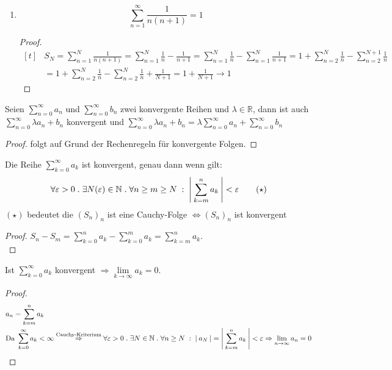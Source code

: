 \documentclass[a4paper,titlepage,oneside]{article}
\def\N{\ensuremath{\mathbb{N}} }
\def\R{\ensuremath{\mathbb{R}} }
\renewcommand{\epsilon}{\ensuremath{\varepsilon} }
\def\sp{\hspace{0,1cm}}
\def\spdot{\sp.\sp}
\def\spcolon{\sp:\sp}
\newcommand{\suminf}[2][n]{\ensuremath{\sum_{#1= 0}^{\infty}{#2}}}
\newcommand{\Suminf}[2][n]{\ensuremath{\sum_{#1=1}^{\infty}{#2}}}
\renewcommand{\liminf}[2][n]{\ensuremath{\lim\limits_{#1 \rightarrow \infty}{#2}}}
\newcommand{\abs}[1]{\ensuremath{\left|\:#1\:\right|}}
\theoremstyle{thmstyle}
\begin{document}
\begin{subbsp}
\begin{enumerate}
\begin{proof}
Würde \((S_N)_{N\ge1}\) konvergieren, dann auch die Teilfolge \((S_{2^N})_{N \ge 1}\), da diese dievergiert, divergiert auch \((S_N)_N\)\\
\end{proof}

\item
\[ \Suminf{\frac{1}{n(n+1)}}= 1 \]

\begin{proof}
\[\begin{aligned}[t]
&S_N = \sum_{n=1}^{N}{\frac{1}{n(n+1)}} = \sum_{n=1}^{N}{\frac{1}{n}} - \frac{1}{n+1} = \sum_{n=1}^{N}{\frac{1}{n}} - \sum_{n=1}^{N}{\frac{1}{n+1}}
= 1 + \sum_{n=2}^{N}{\frac{1}{n}} - \sum_{n=2}^{N+1}{\frac{1}{n}} \\
&= 1 + \sum_{n=2}^{N}{\frac{1}{n}} - \sum_{n=2}^{N}{\frac{1}{n}} + \frac{1}{N+1}
= 1 + \frac{1}{N+1} \longrightarrow 1
\end{aligned}\]
\end{proof}

\end{enumerate}
\end{subbsp}

\begin{subsatz}
Seien \suminf{a_n} und \suminf{b_n} zwei konvergente Reihen und \(\lambda \in \R\),
dann ist auch \(\suminf{\lambda a_n + b_n}\) konvergent und \(\suminf{\lambda a_n + b_n} = \lambda \suminf{a_n} + \suminf{b_n}\)
\begin{proof}
folgt auf Grund der Rechenregeln für konvergente Folgen.
\end{proof}
\end{subsatz}

\begin{subsatz}
Die Reihe \(\suminf[k]{a_k}\) ist konvergent, genau dann wenn gilt:
\[\forall \epsilon > 0 \spdot \exists N(\epsilon) \in \N \spdot \forall n \ge m \ge N \spcolon \abs{\sum_{k=m}^{n}{a_k}} < \epsilon \qquad (\star)\]
\((\star)\) bedeutet die \((S_n)_n\) ist eine Cauchy-Folge \(\Leftrightarrow (S_n)_n\) ist konvergent
\begin{proof}
\(S_n - S_m = \sum_{k=0}^{n}{a_k} - \sum_{k=0}^{m}{a_k} = \sum_{k=m}^{n}{a_k}\).\\
\end{proof}
\end{subsatz}

\begin{subkorr}
Ist \suminf[k]{a_k} konvergent \(\Rightarrow \liminf[k]{a_k} = 0\).
\begin{proof}
\[\begin{aligned}[t]
&a_n = \sum_{k = m}^{n}{a_k} \\
&\text{Da } \suminf[k]{a_k} < \infty \overset{\text{Cauchy-Kriterium}}{\Rightarrow} \forall \epsilon > 0 \spdot \exists N \in \N \spdot \forall n \ge N \spcolon \abs{a_N} = \abs{ \sum_{k = m}^{n}{a_k}} < \epsilon \Rightarrow \liminf{a_n} = 0\\
\end{aligned}\]
\end{proof}
\end{subkorr}
\end{document}
